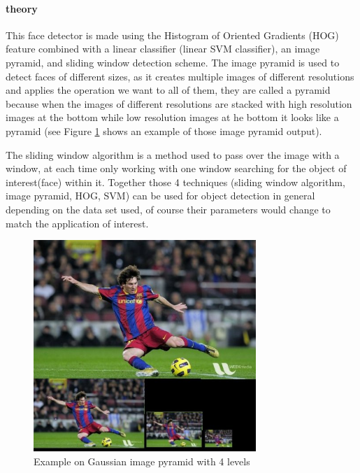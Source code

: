 \paragraph{theory}
This face detector is made using the Histogram of Oriented Gradients (HOG) feature combined with a linear classifier (linear SVM classifier), an image pyramid, and sliding window detection scheme. \newline
The image pyramid is used to detect faces of different sizes, as it creates multiple images of different resolutions and applies the operation we want to all of them, they are called a pyramid because when the images of different resolutions are stacked with high resolution images at the bottom while low resolution images at he bottom it looks like a pyramid (see Figure \ref{fig:gaussian_pyramid} shows an example of those image pyramid output).
\newline

The sliding window algorithm is a method used to pass over the image with a window, at each time only working with one window searching for the object of interest(face) within it.
\newline
Together those 4 techniques (sliding window algorithm, image pyramid, HOG, SVM) can be used for object detection in general depending on the data set used, of course their parameters would change to match the application of interest.

\begin{figure}
	\centering
	\includegraphics[width=0.75\textwidth]{images/gaussian_pyramid.jpg}
	\caption{Example on Gaussian image pyramid with 4 levels}
	\label{fig:gaussian_pyramid}
\end{figure}

